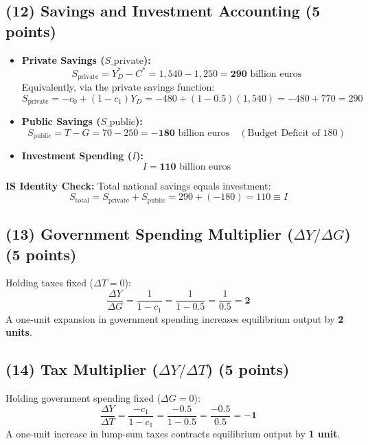 \documentclass[11pt,a4paper]{article}
\begin{document}
\subsection*{(12) Savings and Investment Accounting (5 points)}
\begin{itemize}
    \item \textbf{Private Savings ($S\_{\text{private}}$):}
    \begin{equation}
        S_{\text{private}} = Y_D^* - C^* = 1,540 - 1,250 = \mathbf{290} \text{ billion euros}
    \end{equation}
    Equivalently, via the private savings function:
    \begin{equation}
        S_{\text{private}} = -c_0 + (1 - c_1)Y_D = -480 + (1 - 0.5)(1,540) = -480 + 770 = 290
    \end{equation}
    \item \textbf{Public Savings ($S\_{\text{public}}$):}
    \begin{equation}
        S_{\text{public}} = T - G = 70 - 250 = \mathbf{-180} \text{ billion euros} \quad (\text{Budget Deficit of 180})
    \end{equation}
    \item \textbf{Investment Spending ($I$):}
    \begin{equation}
        I = \mathbf{110} \text{ billion euros}
    \end{equation}
\end{itemize}
\textbf{IS Identity Check:} Total national savings equals investment:
\[S_{\text{total}} = S_{\text{private}} + S_{\text{public}} = 290 + (-180) = 110 \equiv I\]

\subsection*{(13) Government Spending Multiplier ($\Delta Y / \Delta G$) (5 points)}
Holding taxes fixed ($\Delta T = 0$):
\begin{equation}
    \frac{\Delta Y}{\Delta G} = \frac{1}{1 - c_1} = \frac{1}{1 - 0.5} = \frac{1}{0.5} = \mathbf{2}
\end{equation}
A one-unit expansion in government spending increases equilibrium output by \textbf{2 units}.

\subsection*{(14) Tax Multiplier ($\Delta Y / \Delta T$) (5 points)}
Holding government spending fixed ($\Delta G = 0$):
\begin{equation}
    \frac{\Delta Y}{\Delta T} = \frac{-c_1}{1 - c_1} = \frac{-0.5}{1 - 0.5} = \frac{-0.5}{0.5} = \mathbf{-1}
\end{equation}
A one-unit increase in lump-sum taxes contracts equilibrium output by \textbf{1 unit}.
\end{document}
